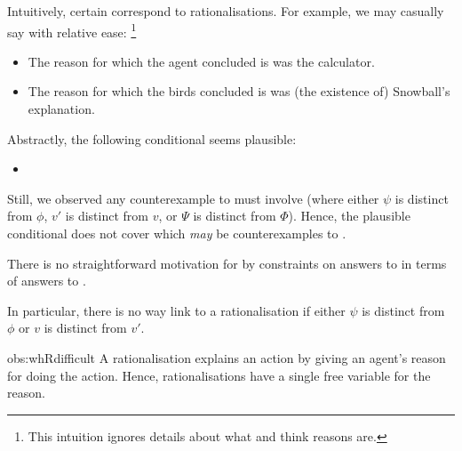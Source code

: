 \begin{note}
  Intuitively, certain  correspond to rationalisations.
  For example, we may casually say with relative ease:%
  \footnote{
    This intuition ignores details about what \citeauthor{Davidson:1963aa} and \citeauthor{Hieronymi:2011aa} think reasons are.
  }

  \begin{itemize}
  \item
    The reason for which the agent concluded \propM{\gistCalcEq{}} is  was the calculator.
  \item
    The reason for which the birds concluded  is  was (the existence of) Snowball's explanation.
  \end{itemize}
  Abstractly, the following conditional seems plausible:
  \begin{itemize}
  \item
  \end{itemize}
  Still, we observed any counterexample to \issueInclusion{} must involve  (where either \(\psi\) is distinct from \(\phi\), \(v'\) is distinct from \(v\), or \(\Psi\) is distinct from \(\Phi\)).
  Hence, the plausible conditional does not cover  which \emph{may} be counterexamples to \issueInclusion{}.

  \begin{observation}
    \label{obs:whRdifficult}%
    There is no straightforward motivation for \issueInclusion{} by constraints on answers to \qWhyR{} in terms of answers to \qHow{}.

    In particular, there is no way link  to a rationalisation if either \(\psi\) is distinct from \(\phi\) or \(v\) is distinct from \(v'\).
  \end{observation}

  \begin{motivation}{obs:whRdifficult}%
    A rationalisation explains an action by giving an agent's reason for doing the action.
    Hence, rationalisations have a single free variable for the \agents{} reason.


\end{motivation}
\end{note}
